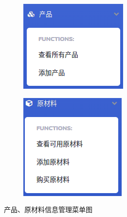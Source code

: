\begin{figure}[H]
    \centering
    \begin{subfigure}{.25\textwidth}
        \centering
        \includegraphics[width=\textwidth]{figures/5product.png}
        \label{fig:product}
    \end{subfigure}
    \qquad
    \begin{subfigure}{.25\textwidth}
        \centering
        \includegraphics[width=\textwidth]{figures/5raw.png}
        \label{fig:raw}
    \end{subfigure}
    \caption{产品、原材料信息管理菜单图}
\end{figure}

